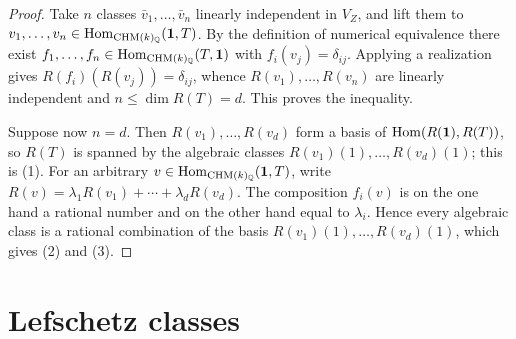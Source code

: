 \begin{proof}
  Take \(n\) classes \(\bar v_1, \dots, \bar v_n\) linearly independent in
  \(V_Z\), and lift them to \(v_1, \dots, v_n \in \mathrm{Hom}_{\mathrm{CHM}(k)_{\mathbb{Q}}}(\mathbf{1}, T)\).
  By the definition of numerical equivalence there exist
  \(f_1, \dots, f_n \in \mathrm{Hom}_{\mathrm{CHM}(k)_{\mathbb{Q}}}(T, \mathbf{1})\) with
  \(f_i(v_j) = \delta_{ij}\). Applying a realization gives
  \(R(f_i)(R(v_j)) = \delta_{ij}\), whence \(R(v_1), \dots, R(v_n)\) are linearly
  independent and \(n \le \dim R(T) = d\). This proves the inequality.

  Suppose now \(n = d\). Then \(R(v_1), \dots, R(v_d)\) form a basis of
  \(\mathrm{Hom}(R(\mathbf{1}), R(T))\), so \(R(T)\) is spanned by the algebraic classes
  \(R(v_1)(1), \dots, R(v_d)(1)\); this is (1). For an arbitrary
  \(v \in \mathrm{Hom}_{\mathrm{CHM}(k)_{\mathbb{Q}}}(\mathbf{1}, T)\), write
  \(R(v) = \lambda_1 R(v_1) + \cdots + \lambda_d R(v_d)\). The composition
  \(f_i(v)\) is on the one hand a rational number and on the other hand equal to
  \(\lambda_i\). Hence every algebraic class is a rational combination of the
  basis \(R(v_1)(1), \dots, R(v_d)(1)\), which gives (2) and (3).
\end{proof}

\section*{Lefschetz classes}

